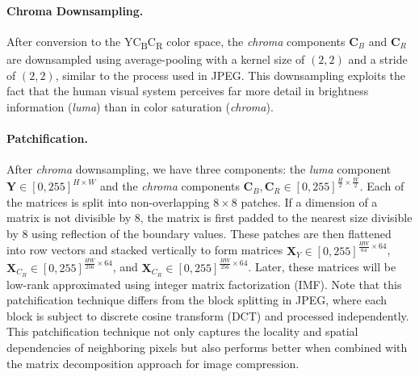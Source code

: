 \paragraph{Chroma Downsampling.} 
After conversion to the YC\textsubscript{B}C\textsubscript{R} color space, the \emph{chroma} components $\bm{C}_B$ and $\bm{C}_R$ are downsampled using average-pooling with a kernel size of $(2, 2)$ and a stride of $(2, 2)$, similar to the process used in JPEG. This downsampling exploits the fact that the human visual system perceives far more detail in brightness information (\emph{luma}) than in color saturation (\emph{chroma}).

\paragraph{Patchification.}
After \emph{chroma} downsampling, we have three components:  the \emph{luma} component $\bm{Y} \in [0, 255]^{H \times W}$ and the \emph{chroma} components $\bm{C}_B, \bm{C}_R \in [0, 255]^{\frac{H}{2} \times \frac{W}{2}}$. Each of the matrices is split into non-overlapping $8 \times 8$ patches. If a dimension of a matrix is not divisible by 8, the matrix is first padded to the nearest size divisible by 8 using reflection of the boundary values. These patches are then flattened into row vectors and stacked vertically to form matrices $\bm{X}_{Y} \in [0, 255]^{\frac{HW}{64} \times 64}$, $\bm{X}_{C_B} \in [0, 255]^{\frac{HW}{256} \times 64}$, and $\bm{X}_{C_R} \in [0, 255]^{\frac{HW}{256} \times 64}$. Later, these matrices will be low-rank approximated using integer matrix factorization (IMF). Note that this patchification technique differs from the block splitting in JPEG, where each block is subject to discrete cosine transform (DCT) and processed independently. This patchification technique not only captures the locality and spatial dependencies of neighboring pixels but also performs better when combined with the matrix decomposition approach for image compression.

